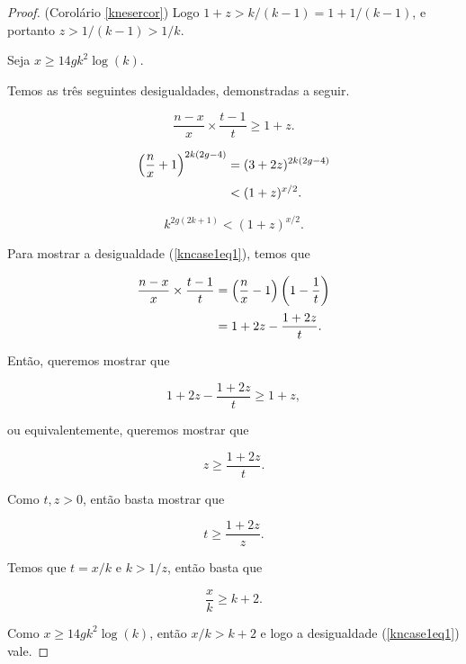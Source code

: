 \begin{proof}{(Corolário \ref{knesercor})}
Logo $1+z > k/(k-1) = 1+1/(k-1)$, e portanto $z > 1/(k-1) > 1/k$.

Seja $x \geq 14gk^2\log(k)$.


Temos as três seguintes desigualdades, demonstradas a seguir.

\begin{equation}\label{kncase1eq1}
\frac{n-x}{x}\times \frac{t-1}{t} \geq 1+z.
\end{equation}

\begin{equation}\label{kncase1eq2}
\setlength{\jot}{5pt}
\begin{aligned}
\left(\frac{n}{x}+1\right)^{2k(2g-4)} &= (3+2z)^{2k(2g-4)}\\
&< (1+z)^{x/2}.
\end{aligned}
\end{equation}


\begin{equation}\label{kncase1eq3}
k^{2g(2k+1)} < (1+z)^{x/2}.
\end{equation}

Para mostrar a desigualdade (\ref{kncase1eq1}), temos que

\begin{equation*}
\setlength{\jot}{5pt}
\begin{aligned}
\frac{n-x}{x}\times \frac{t-1}{t} &= \left(\frac{n}{x} - 1\right)\left(1 - \frac{1}{t}\right)\\
&= 1 + 2z - \frac{1+2z}{t}.
\end{aligned}
\end{equation*}

Então, queremos mostrar que

\[1 + 2z - \frac{1+2z}{t} \geq 1 + z,\]

ou equivalentemente, queremos mostrar que

\[z \geq \frac{1+2z}{t}.\]

Como $t,z > 0$, então basta mostrar que 

\[t \geq \frac{1+2z}{z}.\]

Temos que $t = x/k$ e $k > 1/z$, então basta que

\[\frac{x}{k} \geq k + 2.\]

Como $x \geq 14gk^2\log(k)$, então $x/k > k+2$ e logo a desigualdade (\ref{kncase1eq1}) vale.\vspace{1em}


\end{proof}

